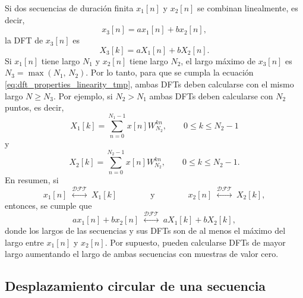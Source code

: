 \documentclass[a4paper]{report}
\begin{document}
Si dos secuencias de duración finita \(x_1[n]\) y \(x_2[n]\) se combinan linealmente, es decir,
\[
 x_3[n]=ax_1[n]+bx_2[n],
\]
la DFT de \(x_3[n]\) es
\begin{equation}\label{eq:dft_properties_linearity_tmp}
 X_3[k]=aX_1[n]+bX_2[n]. 
\end{equation}
Si \(x_1[n]\) tiene largo \(N_1\) y \(x_2[n]\) tiene largo \(N_2\), el largo máximo de \(x_3[n]\) es \(N_3=\max(N_1,\,N_2)\). Por lo tanto, para que se cumpla la ecuación \ref{eq:dft_properties_linearity_tmp}, ambas DFTs deben calcularse con el mismo largo \(N\geq N_3\). Por ejemplo, si \(N_2>N_1\) ambas DFTs deben calcularse con \(N_2\) puntos, es decir,
\[
 X_1[k]=\sum_{n=0}^{N_1-1}x[n]W_{N_2}^{kn},\qquad 0\leq k\leq N_2-1
\]
y
\[
 X_2[k]=\sum_{n=0}^{N_2-1}x[n]W_{N_2}^{kn},\qquad 0\leq k\leq N_2-1.
\]
En resumen, si
\[
 x_1[n]\;\overset{\mathcal{DFT}}{\longleftrightarrow}\;X_1[k]
 \qquad\qquad\textrm{y}\qquad\qquad
 x_2[n]\;\overset{\mathcal{DFT}}{\longleftrightarrow}\;X_2[k],
\]
entonces, se cumple que 
\begin{equation}\label{eq:dft_properties_linearity}
 ax_1[n]+bx_2[n]\;\overset{\mathcal{DFT}}{\longleftrightarrow}\;aX_1[k]+bX_2[k], 
\end{equation}
donde los largos de las secuencias y sus DFTs son de al menos el máximo del largo entre \(x_1[n]\) y \(x_2[n]\). Por supuesto, pueden calcularse DFTs de mayor largo aumentando el largo de ambas secuencias con muestras de valor cero.

\subsection{Desplazamiento circular de una secuencia}\label{dft_properties_circular_shift}
\end{document}
